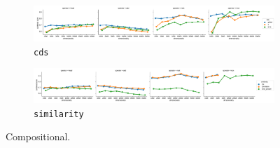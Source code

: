 \begin{figure}[b]
  \centering

  \begin{subfigure}[t]{\textwidth}
    \includegraphics[width=1.1\textwidth]{supplement/figures/compositional-interaction-cds}

  \caption{\texttt{cds}}
  \label{fig:compositional-cds}
  \end{subfigure}

  \begin{subfigure}[t]{\textwidth}
    \includegraphics[width=1.1\textwidth]{supplement/figures/compositional-interaction-similarity}

  \caption{\texttt{similarity}}
  \label{fig:compositional-similarity}
  \end{subfigure}

  \caption{Compositional.}
\end{figure}
